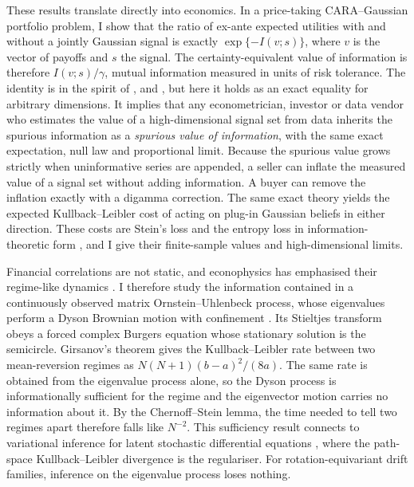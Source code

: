 These results translate directly into economics. In a price-taking CARA--Gaussian portfolio problem, I show that the ratio of ex-ante expected utilities with and without a jointly Gaussian signal is exactly $\exp\{-I(v;s)\}$, where $v$ is the vector of payoffs and $s$ the signal. The certainty-equivalent value of information is therefore $I(v;s)/\gamma$, mutual information measured in units of risk tolerance. The identity is in the spirit of \citet{grossman1980impossibility}, \citet{vannieuwerburgh2010information} and \citet{cabrales2013entropy}, but here it holds as an exact equality for arbitrary dimensions. It implies that any econometrician, investor or data vendor who estimates the value of a high-dimensional signal set from data inherits the spurious information as a \emph{spurious value of information}, with the same exact expectation, null law and proportional limit. Because the spurious value grows strictly when uninformative series are appended, a seller can inflate the measured value of a signal set without adding information. A buyer can remove the inflation exactly with a digamma correction. The same exact theory yields the expected Kullback--Leibler cost of acting on plug-in Gaussian beliefs in either direction. These costs are Stein's loss and the entropy loss in information-theoretic form \citep{james1961estimation,dey1985estimation}, and I give their finite-sample values and high-dimensional limits.

Financial correlations are not static, and econophysics has emphasised their regime-like dynamics \citep{munnix2012identifying,schmitt2013non,allez2012eigenvector}. I therefore study the information contained in a continuously observed matrix Ornstein--Uhlenbeck process, whose eigenvalues perform a Dyson Brownian motion with confinement \citep{dyson1962brownian,chan1992wigner,rogers1993interacting}. Its Stieltjes transform obeys a forced complex Burgers equation whose stationary solution is the semicircle. Girsanov's theorem gives the Kullback--Leibler rate between two mean-reversion regimes as $N(N+1)(b-a)^2/(8a)$. The same rate is obtained from the eigenvalue process alone, so the Dyson process is informationally sufficient for the regime and the eigenvector motion carries no information about it. By the Chernoff--Stein lemma, the time needed to tell two regimes apart therefore falls like $N^{-2}$. This sufficiency result connects to variational inference for latent stochastic differential equations \citep{li2020scalable,rice2026sldi}, where the path-space Kullback--Leibler divergence is the regulariser. For rotation-equivariant drift families, inference on the eigenvalue process loses nothing.

